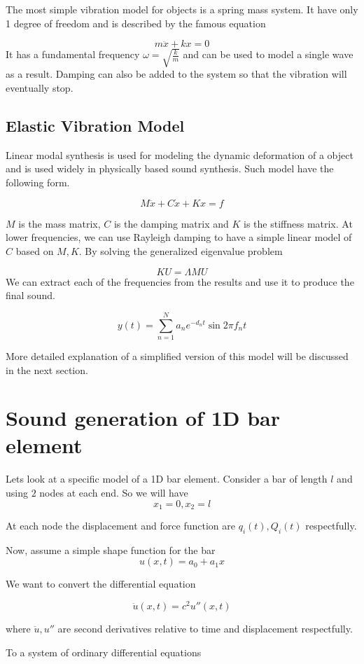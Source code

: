 \documentclass[11pt]{article}
\begin{document}
The most simple vibration model for objects is a spring mass system. It have only 1 degree of freedom and is described by the famous equation

\[
    m\ddot{x} + kx = 0
\]
It has a fundamental frequency $\omega = \sqrt{\frac{k}{m}}$ and can be used to model a single wave as a result. Damping can also be added to the system so that the vibration will eventually stop.

\subsection*{Elastic Vibration Model}
Linear modal synthesis \cite{Shabana1997} is used for modeling the dynamic deformation of a object and is used widely in physically based sound synthesis. Such model have the following form.

\[
    M\ddot{x} + C\dot{x} + Kx = f
\]

$M$ is the mass matrix, $C$ is the damping matrix and $K$ is the stiffness matrix. At lower frequencies, we can use Rayleigh damping to have a simple linear model of $C$ based on $M,K$. 
By solving the generalized eigenvalue problem

\[
KU = \Lambda MU
\]
We can extract each of the frequencies from the results and use it to produce the final sound.

\[
    y(t) = \sum_{n=1}^{N}a_n e^{-d_nt}\sin{2\pi f_n t}
\]

More detailed explanation of a simplified version of this model will be discussed in the next section.

\section*{Sound generation of 1D bar element}
Lets look at a specific model of a 1D bar element. Consider a bar of length $l$ and using $2$ nodes at each end. So we will have
$$x_1 = 0, x_2 = l$$

At each node the displacement and force function are $q_i(t), Q_i(t)$ respectfully.

Now, assume a simple shape function for the bar
$$u(x,t) = a_0 + a_1x$$

We want to convert the differential equation

$$\ddot{u}(x, t) = c^2 u''(x,t)$$

where $\ddot{u},u''$ are second derivatives relative to time and displacement respectfully.

To a system of ordinary differential equations
\end{document}
